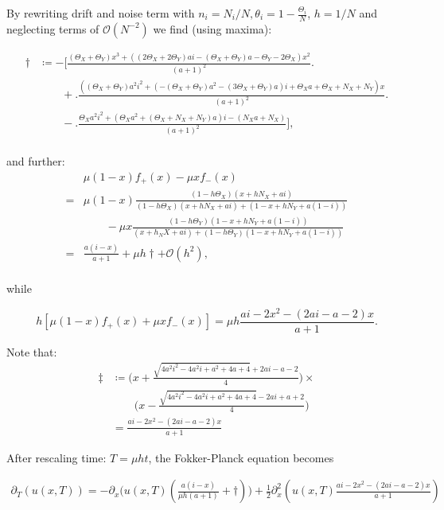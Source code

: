 By rewriting drift and noise term with $n_i = N_i/N, \theta_i = 1- \frac{\Theta_i}{N}$, $h = 1/N$ and neglecting terms of $\mathcal{O}(N^{-2})$ we find (using maxima):

\begin{align*}
	\dagger &\coloneqq -\Big[\frac{(\Theta_X + \Theta_Y)x^3 + ((2\Theta_X + 2\Theta_Y)ai -(\Theta_X + \Theta_Y)a - \Theta_Y - 2\Theta_X)x^2}{(a+1)^2}\Big.\\
	&\qquad + \Big.\frac{((\Theta_X + \Theta_Y)a^2 i^2 + (- (\Theta_X + \Theta_Y)a^2 -(3\Theta_X + \Theta_Y)a)i + \Theta_X a + \Theta_X + N_X + N_Y)x}{(a+1)^2}\Big.\\
	&\qquad - \Big.\frac{\Theta_X a^2 i^2 + (\Theta_X a^2 + (\Theta_X + N_X + N_Y) a)i - (N_X a + N_X)}{(a+1)^2}\Big],\\
\end{align*}

and further: 
\begin{align*}
& \mu(1-x)f_+(x) - \mu xf_-(x)\\
= & \mu(1-x) \frac{(1-h\Theta_X) (x+ hN_X+ ai)}{(1-h\Theta_X) (x + hN_X + ai) + (1-x + hN_Y + a(1-i))}\\
&\qquad - \mu x \frac{(1-h\Theta_Y)(1-x+hN_Y+a(1-i))}{(x+h_NX+ai) + (1-h\Theta_Y)(1-x+hN_Y+a(1-i))}\\
=& \frac{a(i-x)}{a+1} + \mu h \dagger + \mathcal{O}(h^2),\\
\end{align*}

while 

\begin{equation*}
h\left[\mu(1-x)f_+(x) + \mu xf_-(x)\right] = \mu h \frac{ai - 2x^2 - (2ai - a -2)x}{a+1}.
\end{equation*}

Note that:
\begin{align*}
\ddagger &\coloneqq \Big(x+\frac{\sqrt{4a^2i^2-4a^2i+a^2+4a+4}+2ai-a-2}{4}\Big) \times\\
&\qquad \Big(x-\frac{\sqrt{4a^2i^2-4a^2i+a^2+4a+4}-2ai+a+2}{4}\Big)\\
&=\frac{ai - 2x^2 - (2ai - a -2)x}{a+1}
\end{align*}


After rescaling time: $T = \mu h t$, the Fokker-Planck equation becomes

\begin{align*}
\partial_T \left(u\left(x, T\right)\right) = -\partial_x\big(u(x,T)\left(\frac{a(i-x)}{\mu h(a+1)} + \dagger \right)\big) + \frac{1}{2} \partial^2_x\left(u(x,T)\frac{ai - 2x^2 - (2ai - a -2)x}{a+1}\right)
\end{align*}


